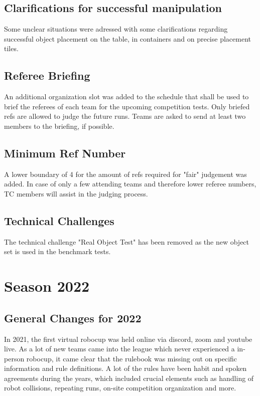 \subsection{Clarifications for successful manipulation}

Some unclear situations were adressed with some clarifications regarding successful object placement on the table, in containers and on precise placement tiles.

\subsection{Referee Briefing}

An additional organization slot was added to the schedule that shall be used to brief the referees of each team for the upcoming competition tests. Only briefed refs are allowed to judge the future runs.
Teams are asked to send at least two members to the briefing, if possible.

\subsection{Minimum Ref Number}

A lower boundary of 4 for the amount of refs required for "fair" judgement was added.
In case of only a few attending teams and therefore lower referee numbers,
TC members will assist in the judging process.

\subsection{Technical Challenges}

The technical challenge "Real Object Test" has been removed as the new object set is used in the benchmark tests.



\section{Season 2022}

\subsection{General Changes for 2022}

In 2021, the first virtual robocup was held online via discord, zoom and youtube live.
As a lot of new teams came into the league which never experienced a in-person robocup,
it came clear that the rulebook was missing out on specific information and rule definitions.
A lot of the rules have been habit and spoken agreements during the years,
which included crucial elements such as handling of robot collisions, repeating runs,
on-site competition organization and more.

